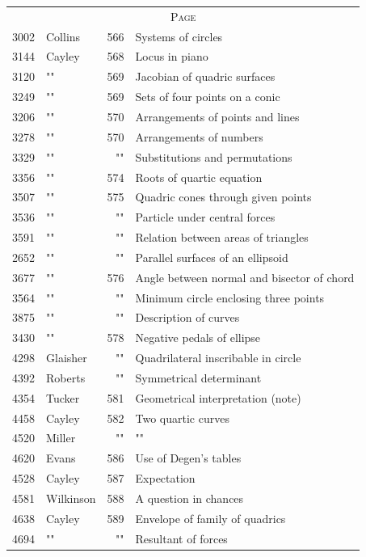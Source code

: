 \documentclass[11pt,a4paper]{article}
\theoremstyle{definition}
\newcommand{\ditto}{""}
\begin{document}
\begin{center}
\begin{tabular}{r@{\quad}l@{\quad}r@{\quad}l}
\multicolumn{4}{c}{\textsc{Page}} \\[0.5ex]
3002 & Collins & 566 & Systems of circles \\
3144 & Cayley & 568 & Locus in piano \\
3120 & \ditto & 569 & Jacobian of quadric surfaces \\
3249 & \ditto & 569 & Sets of four points on a conic \\
3206 & \ditto & 570 & Arrangements of points and lines \\
3278 & \ditto & 570 & Arrangements of numbers \\
3329 & \ditto & \ditto & Substitutions and permutations \\
3356 & \ditto & 574 & Roots of quartic equation \\
3507 & \ditto & 575 & Quadric cones through given points \\
3536 & \ditto & \ditto & Particle under central forces \\
3591 & \ditto & \ditto & Relation between areas of triangles \\
2652 & \ditto & \ditto & Parallel surfaces of an ellipsoid \\
3677 & \ditto & 576 & Angle between normal and bisector of chord \\
3564 & \ditto & \ditto & Minimum circle enclosing three points \\
3875 & \ditto & \ditto & Description of curves \\
3430 & \ditto & 578 & Negative pedals of ellipse \\
4298 & Glaisher & \ditto & Quadrilateral inscribable in circle \\
4392 & Roberts & \ditto & Symmetrical determinant \\
4354 & Tucker & 581 & Geometrical interpretation (note) \\
4458 & Cayley & 582 & Two quartic curves \\
4520 & Miller & \ditto & \ditto \\
4620 & Evans & 586 & Use of Degen's tables \\
4528 & Cayley & 587 & Expectation \\
4581 & Wilkinson & 588 & A question in chances \\
4638 & Cayley & 589 & Envelope of family of quadrics \\
4694 & \ditto & \ditto & Resultant of forces \\

\end{tabular}
\end{center}
\end{document}
